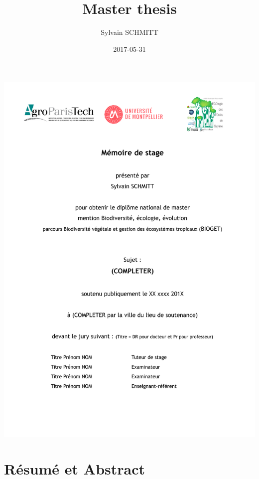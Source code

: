 \documentclass[]{article}
\title{Master thesis}
\author{Sylvain SCHMITT}
\date{2017-05-31}
\theoremstyle{definition}
\theoremstyle{definition}
\theoremstyle{remark}
\begin{document}
\maketitle

\date{}

\thispagestyle{empty}
\begin{center}
\includegraphics{images/main.pdf}
\end{center}

\setlength{\abovedisplayskip}{-5pt}
\setlength{\abovedisplayshortskip}{-5pt}

{
\hypersetup{linkcolor=black}
\setcounter{tocdepth}{2}
\tableofcontents
}
\section*{Résumé et Abstract}\label{resume-et-abstract}
\end{document}
